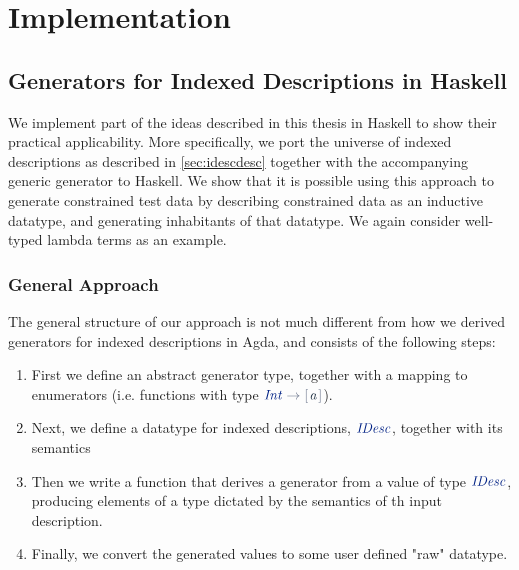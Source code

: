 \documentclass[a4paper,msc,twosized=semi]{uustthesis}
\newcommand*{\mathcolor}{}
\def\mathcolor#1#{\mathcoloraux{#1}}
\newcommand*{\mathcoloraux}[3]{%
  \protect\leavevmode
  \begingroup
    \color#1{#2}#3%
  \endgroup
}
\newcommand{\HSSpecial}[1]{\mathcolor{hsblue4}{#1}}
\newcommand{\HSSym}[1]{\mathcolor{hsblue4}{#1}}
\newcommand{\HSCon}[1]{\mathcolor{hsblue3}{\mathit{#1}}}
\newcommand{\HSVar}[1]{\mathcolor{hsblue5}{\mathit{#1}}}
\begin{document}

\part{Implementation}

\chapter{Generators for Indexed Descriptions in Haskell}
We implement part of the ideas described in this thesis in Haskell to show their 
practical applicability. More specifically, we port the universe of indexed 
descriptions as described in \cref{sec:idescdesc} together with the accompanying 
generic generator to Haskell. We show that it is possible using this approach to 
generate constrained test data by describing constrained data as an inductive datatype,
 and generating inhabitants of that datatype. We again consider well-typed lambda 
 terms as an example. 

\section{General Approach}

  The general structure of our approach is not much different from how we derived 
  generators for indexed descriptions in Agda, and consists of the following steps: 

  \begin{enumerate}
    \item 
      First we define an abstract generator type, together with a mapping to 
      enumerators (i.e. functions with type \ensuremath{\HSCon{Int}\HSSym{\to} \HSSpecial{\HSSym{[\mskip1.5mu} }\HSVar{a}\HSSpecial{\HSSym{\mskip1.5mu]}}}). 

    \item 
      Next, we define a datatype for indexed descriptions, \ensuremath{\HSCon{IDesc}}, together with its 
      semantics

    \item 
      Then we write a function that derives a generator from a value of type \ensuremath{\HSCon{IDesc}}, 
      producing elements of a type dictated by the semantics of th input description. 

    \item 
      Finally, we convert the generated values to some user defined "raw" datatype.  
  \end{enumerate}
\end{document}
